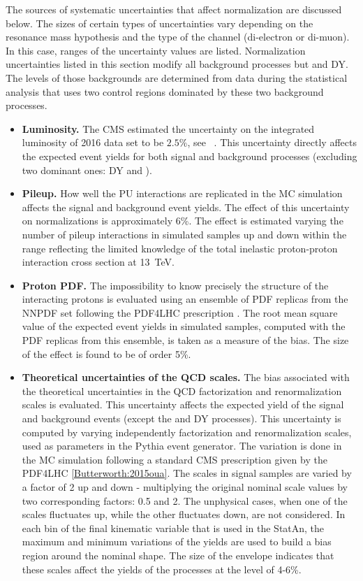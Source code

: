 \begin{small}
The sources of systematic uncertainties that affect normalization are discussed below. The sizes of certain types of uncertainties vary depending on the resonance mass hypothesis and the type of the channel (di-electron or di-muon). In this case, ranges of the uncertainty values are listed. Normalization uncertainties listed in this section modify all background processes but \ttbar and DY. The levels of those backgrounds are determined from data during the statistical analysis that uses two control regions dominated by these two background processes.
  
\begin{itemize}

\item{\bf Luminosity.} 
The CMS estimated the uncertainty on the integrated luminosity of 2016 data set to be $2.5\%$, see ~\cite{CMS-PAS-LUM-17-001}. This uncertainty directly affects the expected event yields for both signal and background processes (excluding two dominant ones: DY and \ttbar).
  
\item{\bf Pileup.} 
How well the PU interactions are replicated in the MC simulation affects the signal and background event yields. The effect of this uncertainty on normalizations is approximately 6\%. The effect is estimated varying the number of pileup interactions in simulated samples up and down within the range reflecting the limited knowledge of the total inelastic proton-proton interaction cross section at 13~TeV. 

\item{\bf Proton PDF.} 
The impossibility to know precisely the structure of the interacting protons is evaluated using an ensemble of PDF replicas from the NNPDF set \cite{Ball:2014uwa} following the PDF4LHC prescription \cite{Botje:2011sn,Alekhin:2011sk}. The root mean square value of the expected event yields in simulated samples, computed with the PDF replicas from this ensemble, is taken as a measure of the bias. The size of the effect is found to be of order 5\%. 
  
\item{\bf Theoretical uncertainties of the QCD scales.} 
The bias associated with the theoretical uncertainties in the QCD factorization and renormalization scales is evaluated. This uncertainty affects the expected yield of the signal and background events (except the \ttbar and DY processes). This uncertainty is computed by varying independently factorization and renormalization scales, used as parameters in the Pythia event generator. The variation is done in the MC simulation following a standard CMS prescription given by the PDF4LHC \ref{Butterworth:2015oua}. The scales in signal samples are varied by a factor of 2 up and down - multiplying the original nominal scale values by two corresponding factors: 0.5 and 2. The unphysical cases, when one of the scales fluctuates up, while the other fluctuates down, are not considered. In each bin of the final kinematic variable that is used in the StatAn, the maximum and minimum variations of the yields are used to build a bias region around the nominal shape. The size of the envelope indicates that these scales affect the yields of the processes at the level of 4-6\%.


\end{itemize}
\end{small}
